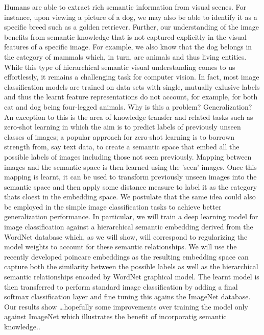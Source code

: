 \documentclass[12pt]{report}
\begin{document}
Humans are able to extract rich semantic information from visual scenes. For instance, upon viewing a picture of a dog, we may also be able to identify it as a specific breed such as a golden retriever. Further, our understanding of the image benefits from semantic knowledge that is not captured explicitly in the visual features of a specific image. For example, we also know that the dog belongs in the category of mammals which, in turn, are animals and thus living entities. While this type of hierarchical semantic visual understanding comes to us effortlessly, it remains a challenging task for computer vision. In fact, most image classification models are trained on data sets with single, mutually exlusive labels and thus the learnt feature representations do not account, for example, for both cat and dog being four-legged animals. Why is this a problem? Generalization?  An exception to this is the area of knowledge transfer and related tasks such as zero-shot learning in which the aim is to predict labels of previously unseen classes of images; a popular approach for zero-shot learning is to borrown strength from, say text data, to create a semantic space that embed all the possible labels of images including those not seen previously. Mapping between images and the semantic space is then learned using the 'seen' images. Once this mapping is learnt, it can be used to transform previously unseen images into the semantic space and then apply some distance measure to label it as the category thats cloest in the embedding space. We postulate that the same idea could also be employed in the simple image classification tasks to achieve better generalization performance. In particular, we will train a deep learning model for image classification against a hierarchical semantic embedding derived from the WordNet database which, as we will show, will correspond to regularizing the model weights to account for these semantic relationships. We will use the recently developed poincare embeddings as the resulting embedding space can capture both the similarity between the possible labels as well as the hierarchical semantic relationships encoded by WordNet graphical model. The learnt model is then transferred to perform standard image classification by adding a final softmax classification layer and fine tuning this agains the ImageNet database. Our results show \dots hopefully some improvements over training the model only against ImageNet which illustrates the benefit of incorporatig semantic knowledge.. \\
\end{document}
